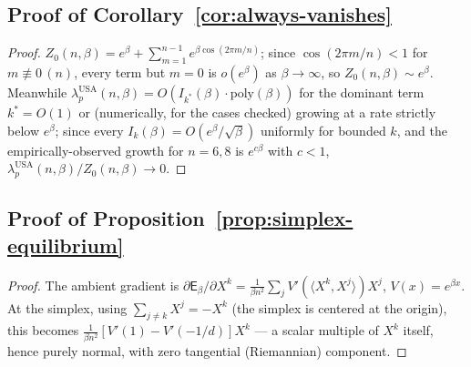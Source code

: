 \documentclass[11pt]{article}
\begin{document}
\subsection{Proof of Corollary~\ref{cor:always-vanishes}}
\label{app:always-vanishes}

\begin{proof}
$Z_0(n,\beta) = e^\beta + \sum_{m=1}^{n-1}e^{\beta\cos(2\pi m/n)}$; since $\cos(2\pi m/n)<1$ for $m\not\equiv0\,(n)$, every term but $m=0$ is $o(e^\beta)$ as $\beta\to\infty$, so $Z_0(n,\beta)\sim e^\beta$. Meanwhile $\lambda_p^{\mathrm{USA}}(n,\beta) = O(I_{k^*}(\beta)\cdot\mathrm{poly}(\beta))$ for the dominant term $k^*=O(1)$ or (numerically, for the cases checked) growing at a rate strictly below $e^\beta$; since every $I_k(\beta)=O(e^\beta/\sqrt\beta)$ uniformly for bounded $k$, and the empirically-observed growth for $n=6,8$ is $e^{c\beta}$ with $c<1$, $\lambda_p^{\mathrm{USA}}(n,\beta)/Z_0(n,\beta)\to0$.
\end{proof}

\subsection{Proof of Proposition~\ref{prop:simplex-equilibrium}}
\label{app:simplex-equilibrium}

\begin{proof}
The ambient gradient is $\partial\mathsf{E}_\beta/\partial X^k = \frac{1}{\beta n^2}\sum_j V'(\langle X^k,X^j\rangle)X^j$, $V(x)=e^{\beta x}$. At the simplex, using $\sum_{j\ne k}X^j=-X^k$ (the simplex is centered at the origin), this becomes $\frac{1}{\beta n^2}[V'(1)-V'(-1/d)]X^k$ --- a scalar multiple of $X^k$ itself, hence purely normal, with zero tangential (Riemannian) component.
\end{proof}
\end{document}
